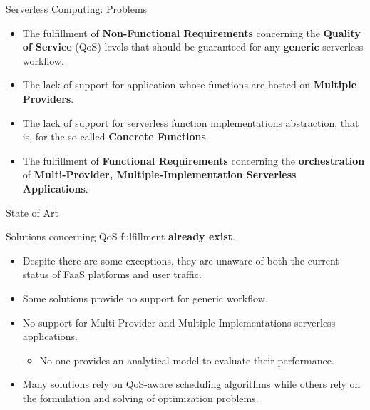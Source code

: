 \documentclass[13.5pt]{beamer}
\newcommand{\B}[1]{\textcolor{TorVergataColor}{\textbf{#1}}}
\begin{document}
\begin{frame}{Serverless Computing: Problems}
	
	\begin{itemize}
		\item The fulfillment of \B{Non-Functional Requirements} concerning the \B{Quality of Service} (QoS) levels that should be guaranteed for 
		any \B{generic} serverless workflow.
		\vspace{\baselineskip}
		\item The lack of support for application whose functions are hosted on \B{Multiple Providers}.
		\vspace{\baselineskip}
		\item The lack of support for serverless function implementations abstraction, that is, for the so-called \B{Concrete Functions}.
		\vspace{\baselineskip}
		\item The fulfillment of \B{Functional Requirements} concerning the \B{orchestration} of \B{Multi-Provider, Multiple-Implementation Serverless Applications}.
	\end{itemize}

\end{frame} 
\begin{frame}{State of Art}

Solutions concerning QoS fulfillment \B{already exist}.
\vspace{\baselineskip}
\begin{itemize}
	\item Despite there are some exceptions, they are unaware of both the current status of FaaS platforms and user traffic.
	\vspace{\baselineskip}
	\item Some solutions provide no support for generic workflow.
	\vspace{\baselineskip}
	\item No support for Multi-Provider and Multiple-Implementations serverless applications. 
		\begin{itemize}
			\item No one provides an analytical model to evaluate their performance.
		\end{itemize}
	\vspace{\baselineskip}
	\item Many solutions rely on QoS-aware scheduling algorithms while others rely on the formulation and solving of optimization problems.
\end{itemize}

\end{frame} 
\end{document}
